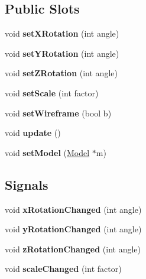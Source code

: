 \subsection*{Public Slots}
\begin{DoxyCompactItemize}
\item 
\mbox{\label{class_glwidget_abdb807d1e98041d3813543dd2f043d9e}} 
void {\bfseries set\+X\+Rotation} (int angle)
\item 
\mbox{\label{class_glwidget_a980d52bca9bf5817911029877a68e584}} 
void {\bfseries set\+Y\+Rotation} (int angle)
\item 
\mbox{\label{class_glwidget_ad9318fc18c0abc761ce038c6afbf1814}} 
void {\bfseries set\+Z\+Rotation} (int angle)
\item 
\mbox{\label{class_glwidget_a2ea79df264aadd3584488296749f370c}} 
void {\bfseries set\+Scale} (int factor)
\item 
\mbox{\label{class_glwidget_a52a956313956890bf13741c218f8fa3d}} 
void {\bfseries set\+Wireframe} (bool b)
\item 
\mbox{\label{class_glwidget_a2b49ec71ab84e52adc78ba062c235ac0}} 
void {\bfseries update} ()
\item 
\mbox{\label{class_glwidget_a2786dcfd2ee92efbbd2c457dc1ac7063}} 
void {\bfseries set\+Model} (\mbox{\hyperlink{class_model}{Model}} $\ast$m)
\end{DoxyCompactItemize}
\subsection*{Signals}
\begin{DoxyCompactItemize}
\item 
\mbox{\label{class_glwidget_a179006a4c52b573f9e6791deb16f1f2a}} 
void {\bfseries x\+Rotation\+Changed} (int angle)
\item 
\mbox{\label{class_glwidget_a7c8d9abf4c47760ea6c6fff8ed12e0a5}} 
void {\bfseries y\+Rotation\+Changed} (int angle)
\item 
\mbox{\label{class_glwidget_ab1b7ea4daa9671708ba4dd12fa8c52a9}} 
void {\bfseries z\+Rotation\+Changed} (int angle)
\item 
\mbox{\label{class_glwidget_a874d1da9fed05d5063176ec5195aa483}} 
void {\bfseries scale\+Changed} (int factor)
\end{DoxyCompactItemize}
